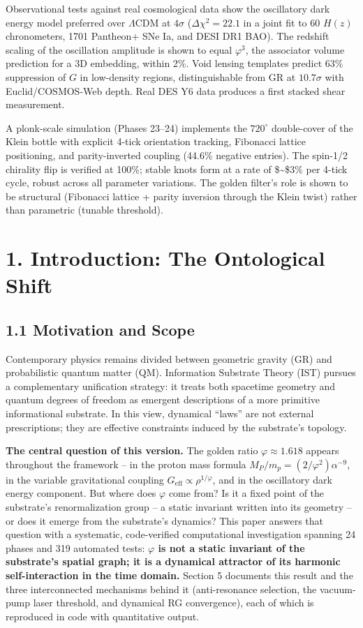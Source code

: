 \documentclass[
  11pt,
]{article}
\begin{document}
Observational tests against real cosmological data show the oscillatory
dark energy model preferred over \(\Lambda\)CDM at \(4\sigma\)
(\(\Delta\chi^2 = 22.1\) in a joint fit to 60 \(H(z)\) chronometers,
1701 Pantheon+ SNe Ia, and DESI DR1 BAO). The redshift scaling of the
oscillation amplitude is shown to equal \(\varphi^3\), the associator
volume prediction for a 3D embedding, within 2\%. Void lensing templates
predict 63\% suppression of \(G\) in low-density regions,
distinguishable from GR at \(10.7\sigma\) with Euclid/COSMOS-Web depth.
Real DES Y6 data produces a first stacked shear measurement.

A plonk-scale simulation (Phases 23--24) implements the \(720^{\circ}\)
double-cover of the Klein bottle with explicit 4-tick orientation
tracking, Fibonacci lattice positioning, and parity-inverted coupling
(44.6\% negative entries). The spin-1/2 chirality flip is verified at
100\%; stable knots form at a rate of \$\sim\$3\% per 4-tick cycle,
robust across all parameter variations. The golden filter's role is
shown to be structural (Fibonacci lattice + parity inversion through the
Klein twist) rather than parametric (tunable threshold).

\section{1. Introduction: The Ontological
Shift}\label{introduction-the-ontological-shift}

\subsection{1.1 Motivation and Scope}\label{motivation-and-scope}

Contemporary physics remains divided between geometric gravity (GR) and
probabilistic quantum matter (QM). Information Substrate Theory (IST)
pursues a complementary unification strategy: it treats both spacetime
geometry and quantum degrees of freedom as emergent descriptions of a
more primitive informational substrate. In this view, dynamical ``laws''
are not external prescriptions; they are effective constraints induced
by the substrate's topology.

\textbf{The central question of this version.} The golden ratio
\(\varphi \approx 1.618\) appears throughout the framework -- in the
proton mass formula \(M_P/m_p = (2/\varphi^2)\alpha^{-9}\), in the
variable gravitational coupling
\(G_{\text{eff}} \propto \rho^{1/\varphi}\), and in the oscillatory dark
energy component. But where does \(\varphi\) come from? Is it a fixed
point of the substrate's renormalization group -- a static invariant
written into its geometry -- or does it emerge from the substrate's
dynamics? This paper answers that question with a systematic,
code-verified computational investigation spanning 24 phases and 319
automated tests: \textbf{\(\varphi\) is not a static invariant of the
substrate's spatial graph; it is a dynamical attractor of its harmonic
self-interaction in the time domain.} Section 5 documents this result
and the three interconnected mechanisms behind it (anti-resonance
selection, the vacuum-pump laser threshold, and dynamical RG
convergence), each of which is reproduced in code with quantitative
output.
\end{document}

